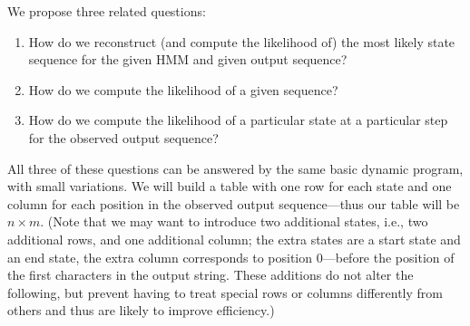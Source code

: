 \documentclass[11pt]{article}
\begin{document}
We propose three related questions:
\begin{enumerate}
  \item How do we reconstruct (and compute the likelihood of) the most
  likely state sequence for the given HMM and given output sequence?  
  \item How do we compute the likelihood of a given sequence?  
  \item How do we compute the likelihood of a particular state at
  a particular step for the observed output sequence?
\end{enumerate}
All three of these questions can be answered by the same basic
dynamic program, with small variations.  We will build a table
with one row for each state and one column for each position
in the observed output sequence---thus our table will be $n\times m$.
(Note that we may want to introduce two additional states, i.e.,
two additional rows, and one additional column; the extra states are
a start state and an end state, the extra column corresponds to position
0---before the position of the first characters in the output string.
These additions do not alter the following, but prevent having to treat
special rows or columns differently from others and thus are likely to
improve efficiency.)
\end{document}

